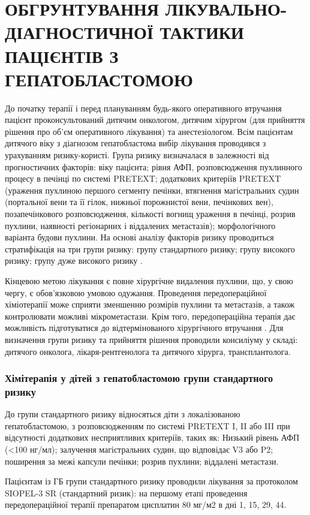 \chapter{ОБГРУНТУВАННЯ ЛІКУВАЛЬНО-ДІАГНОСТИЧНОЇ ТАКТИКИ ПАЦІЄНТІВ З ГЕПАТОБЛАСТОМОЮ}

До початку терапії і перед плануванням будь-якого оперативного втручання пацієнт проконсультований дитячим онкологом, дитячим хірургом (для прийняття рішення про об’єм оперативного лікування) та анестезіологом.
Всім пацієнтам дитячого віку з діагнозом гепатобластома вибір лікування проводився з урахуванням ризику-користі. Група ризику визначалася в залежності від прогностичних факторів: віку пацієнта; рівня АФП, розповсюдження пухлинного процесу в печінці по системі PRETEXT; додаткових критеріїв PRETEXT (ураження пухлиною першого сегменту печінки, втягнення магістральних судин (портальної вени та її гілок, нижньої порожнистої вени, печінкових вен), позапечінкового розповсюдження, кількості вогнищ ураження в печінці, розрив пухлини, наявності регіонарних і віддалених метастазів); морфологічного варіанта будови пухлини. На основі аналізу факторів ризику проводиться стратифікація на три групи ризику: групу стандартного ризику; групу високого ризику; групу дуже високого ризику \cite{pmid24759227}.

Кінцевою метою лікування є повне хірургічне видалення пухлини, що, у свою чергу, є обов'язковою умовою одужання. Проведення передопераційної хіміотерапії може сприяти зменшенню розмірів пухлини та метастазів, а також контролювати можливі мікрометастази. Крім того, передопераційна терапія дає можливість підготуватися до відтермінованого хірургічного втручання \cite{pmid31584686}. Для визначення групи ризику та прийняття рішення проводили консиліуму у складі: дитячого онколога, лікаря-рентгенолога та дитячого хірурга, трансплантолога.

\subsection{Хімітерапія у дітей з гепатобластомою групи стандартного ризику}
До групи стандартного ризику відносяться діти з локалізованою гепатобластомою, з розповсюдженням по системі PRETEXT I, II або III при відсутності додаткових несприятливих  критеріїв, таких як: Низький рівень  АФП (<100 нг/мл); залучення магістральних судин, що відповідає V3 або P2; поширення за межі капсули печінки; розрив пухлини; віддалені метастази\cite{pmid31155201}.    

Пацієнтам із ГБ групи стандартного ризику проводили лікування за протоколом SIOPEL-3 SR (стандартний ризик): на першому етапі проведення передопераційної терапії препаратом цисплатин 80 мг/м2 в дні 1, 15, 29, 44.

